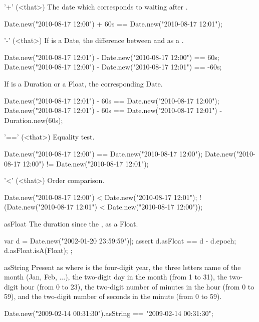 \begin{urbiscriptapi}
\item['+'](<that>)%
  The date which corresponds to waiting  
  after \this.
\begin{urbiassert}
Date.new("2010-08-17 12:00") + 60s == Date.new("2010-08-17 12:01");
\end{urbiassert}

\item['-'](<that>)%
  If  is a Date, the difference between \this and  as a
  .
\begin{urbiassert}
Date.new("2010-08-17 12:01") - Date.new("2010-08-17 12:00") ==  60s;
Date.new("2010-08-17 12:00") - Date.new("2010-08-17 12:01") == -60s;
\end{urbiassert}

If  is a Duration or a Float, the corresponding Date.

\begin{urbiassert}
Date.new("2010-08-17 12:01") - 60s == Date.new("2010-08-17 12:00");
Date.new("2010-08-17 12:01") - 60s
  == Date.new("2010-08-17 12:01") - Duration.new(60s);
\end{urbiassert}

\item['=='](<that>)%
  Equality test.
\begin{urbiassert}
Date.new("2010-08-17 12:00") == Date.new("2010-08-17 12:00");
Date.new("2010-08-17 12:00") != Date.new("2010-08-17 12:01");
\end{urbiassert}

\item['<'](<that>)%
  Order comparison.
\begin{urbiassert}
   Date.new("2010-08-17 12:00") < Date.new("2010-08-17 12:01");
! (Date.new("2010-08-17 12:01") < Date.new("2010-08-17 12:00"));
\end{urbiassert}

\item[asFloat] The duration since the , as a Float.
\begin{urbiscript}
var d = Date.new("2002-01-20 23:59:59")|;
assert
{
  d.asFloat == d - d.epoch;
  d.asFloat.isA(Float);
};
\end{urbiscript}

\item[asString] Present as  where  is the four-digit
  year,  the three letters name of the month (Jan, Feb, ...),
   the two-digit day in the month (from 1 to 31),  the
  two-digit hour (from 0 to 23),  the two-digit number of minutes in
  the hour (from 0 to 59), and  the two-digit number of seconds in
  the minute (from 0 to 59).
\begin{urbiassert}
Date.new("2009-02-14 00:31:30").asString == "2009-02-14 00:31:30";
\end{urbiassert}


\end{urbiscriptapi}
